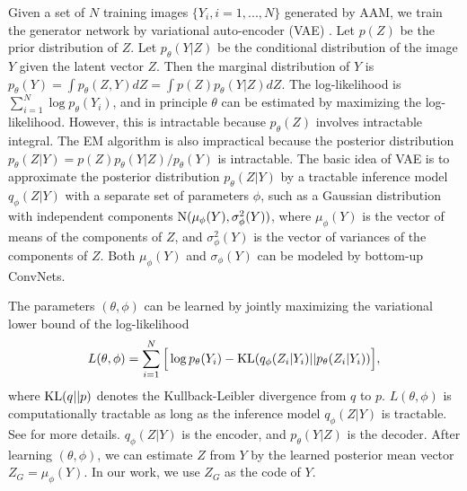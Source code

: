 \documentclass{article}
\def\KL{{\rm KL}}
\begin{document}
Given a set of $N$ training images $\{Y_i, i = 1, ..., N\}$  generated by AAM, we train the generator network by variational auto-encoder (VAE) \cite{KingmaCoRR13,RezendeICML2014,salimans2015markov}. Let $p(Z)$ be the prior distribution of $Z$. Let $p_\theta(Y|Z)$ be the conditional distribution of the image $Y$ given the latent vector $Z$. Then the marginal distribution of $Y$ is $p_\theta(Y) = \int p_\theta(Z, Y) dZ = \int p(Z) p_\theta(Y|Z) dZ$. The log-likelihood is $\sum_{i=1}^{N} \log p_\theta(Y_i)$, and in principle $\theta$ can be estimated by maximizing the log-likelihood. However, this is intractable because $p_\theta(Z)$ involves intractable integral. The EM algorithm \cite{dempster1977maximum} is also impractical because the posterior distribution $p_\theta(Z|Y) = p(Z) p_\theta(Y|Z)/p_\theta(Y)$ is intractable. The basic idea of VAE is to approximate the posterior distribution $p_\theta(Z|Y)$ by a tractable inference model $q_\phi(Z|Y)$ with a separate set of parameters $\phi$, such as a Gaussian distribution with independent components ${\rm N}(\mu_\phi(Y), \sigma^2_\phi(Y))$, where $\mu_\phi(Y)$ is the vector of means of the components of $Z$, and $\sigma^2_\phi(Y)$ is the vector of variances of the components of $Z$. Both $\mu_\phi(Y)$ and $\sigma_\phi(Y)$ can be modeled by bottom-up ConvNets. 

The parameters $(\theta, \phi)$ can be learned by jointly maximizing the variational lower bound of the log-likelihood 
\begin{eqnarray}
\label{eqn4}
 L(\theta, \phi) = \sum_{i=1}^{N}\Big[ \log p_\theta(Y_i) - {\rm KL}(q_\phi(Z_i|Y_i)|| p_\theta(Z_i|Y_i)) \Big], 
\end{eqnarray}
where ${\rm KL}(q||p)$ denotes the Kullback-Leibler divergence from $q$ to $p$. $L(\theta, \phi)$ is computationally tractable as long as the inference model $q_\phi(Z|Y)$ is tractable. See \cite{kingma2013auto} for more details. $q_\phi(Z|Y)$ is the encoder, and $p_\theta(Y|Z)$ is the decoder. After learning $(\theta, \phi)$, we can estimate $Z$ from $Y$ by the learned posterior mean vector $Z_G  =  \mu_\phi(Y)$. In our work, we use $Z_G$ as the code of $Y$. 


\end{document}
